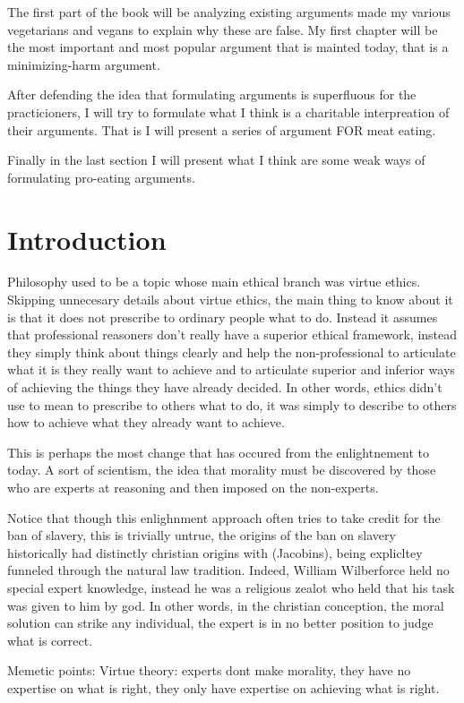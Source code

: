 The first part of the book will be analyzing existing arguments made my various vegetarians and vegans to explain why these are false. My first chapter will be the most important and most popular argument that is mainted today, that is a minimizing-harm argument. 

After defending the idea that formulating arguments is superfluous for the practicioners, I will try to formulate what I think is a charitable interpreation of their arguments. That is I will present a series of argument FOR meat eating. 

Finally in the last section I will present what I think are some weak ways of formulating pro-eating arguments. 


\chapter{Introduction}

Philosophy used to be a topic whose main ethical branch was virtue ethics. Skipping unnecesary details about virtue ethics, the main thing to know about it is that it does not prescribe to ordinary people what to do. Instead it assumes that professional reasoners don't really have a superior ethical framework, instead they simply think about things clearly and help the non-professional to articulate what it is they really want to achieve and to articulate superior and inferior ways of achieving the things they have already decided. In other words, ethics didn't use to mean to prescribe to others what to do, it was simply to describe to others how to achieve what they already want to achieve. 

This is perhaps the most change that has occured from the enlightnement to today. A sort of scientism, the idea that morality must be discovered by those who are experts at reasoning and then imposed on the non-experts. 

Notice that though this enlighnment approach often tries to take credit for the ban of slavery, this is trivially untrue, the origins of the ban on slavery historically had distinctly christian origins with (Jacobins), being explicltey funneled through the natural law tradition. Indeed, William Wilberforce held no special expert knowledge, instead he was a religious zealot who held that his task was given to him by god. In other words, in the christian conception, the moral solution can strike any individual, the expert is in no better position to judge what is correct. 

Memetic points: 
Virtue theory: experts dont make morality, they have no expertise on what is right, they only have expertise on achieving what is right. 
